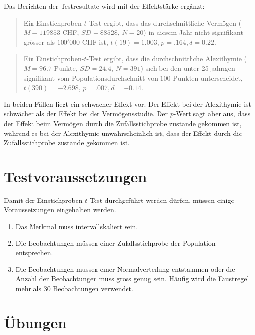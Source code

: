 \documentclass[
]{book}
\providecommand{\tightlist}{%
  \setlength{\itemsep}{0pt}\setlength{\parskip}{0pt}}
\theoremstyle{definition}
\theoremstyle{definition}
\theoremstyle{definition}
\theoremstyle{definition}
\theoremstyle{remark}
\begin{document}
Das Berichten der Testresultate wird mit der Effektstärke ergänzt:

\begin{quote}
Ein Einstichproben-\(t\)-Test ergibt, dass das durchschnittliche Vermögen (\(M = 119853\) CHF, \(SD = 88528\), \(N = 20\)) in diesem Jahr nicht signifikant grösser als \(100'000\) CHF ist, \(t(19) = 1.003\), \(p = .164, d = 0.22\).
\end{quote}

\begin{quote}
Ein Einstichproben-\(t\)-Test ergibt, dass die durchschnittliche Alexithymie (\(M = 96.7\) Punkte, \(SD = 24.4\), \(N = 391\)) sich bei den unter 25-jährigen signifikant vom Populationsdurchschnitt von \(100\) Punkten unterscheidet, \(t(390) = -2.698\), \(p = .007, d = -0.14\).
\end{quote}

In beiden Fällen liegt ein schwacher Effekt vor. Der Effekt bei der Alexithymie ist schwächer als der Effekt bei der Vermögensstudie. Der \(p\)-Wert sagt aber aus, dass der Effekt beim Vermögen durch die Zufallsstichprobe zustande gekommen ist, während es bei der Alexithymie unwahrscheinlich ist, dass der Effekt durch die Zufallsstichprobe zustande gekommen ist.

\section{Testvoraussetzungen}\label{testvoraussetzungen}

Damit der Einstichproben-\(t\)-Test durchgeführt werden dürfen, müssen einige Voraussetzungen eingehalten werden.

\begin{enumerate}
\def\labelenumi{\arabic{enumi}.}
\tightlist
\item
  Das Merkmal muss intervallskaliert sein.
\item
  Die Beobachtungen müssen einer Zufallsstichprobe der Population entsprechen.
\item
  Die Beobachtungen müssen einer Normalverteilung entstammen oder die Anzahl der Beobachtungen muss gross genug sein. Häufig wird die Faustregel mehr als \(30\) Beobachtungen verwendet.
\end{enumerate}

\section{Übungen}\label{uxfcbungen-2}
\end{document}
